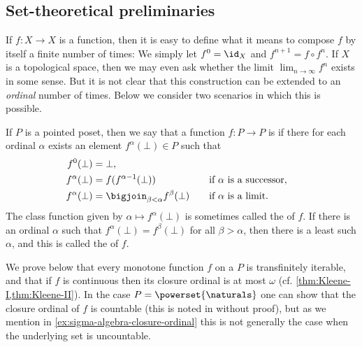 \subsection{Set-theoretical preliminaries}

If $f \colon X \to X$ is a function, then it is easy to define what it means to compose $f$ by itself a finite number of times: We simply let $f^0 = \id_X$ and $f^{n+1} = f \circ f^n$. If $X$ is a topological space, then we may even ask whether the limit $\lim_{n \to \infty} f^n$ exists in some sense. But it is not clear that this construction can be extended to an \emph{ordinal} number of times. Below we consider two scenarios in which this is possible.

If $P$ is a pointed poset, then we say that a function $f \colon P \to P$ is  if there for each ordinal $\alpha$ exists an element $f^\alpha(\bot) \in P$ such that
%
\begin{alignat*}{2}
    f^0(\bot)
        &= \bot, \\
    f^\alpha(\bot)
        &= f(f^{\alpha-1}(\bot))
        \quad &&\text{if $\alpha$ is a successor}, \\
    f^\alpha(\bot)
        &= \bigjoin_{\beta < \alpha} f^\beta(\bot)
        \quad &&\text{if $\alpha$ is a limit}.
\end{alignat*}
%
The class function given by $\alpha \mapsto f^\alpha(\bot)$ is sometimes called the  of $f$. If there is an ordinal $\alpha$ such that $f^\alpha(\bot) = f^\beta(\bot)$ for all $\beta > \alpha$, then there is a least such $\alpha$, and this is called the  of $f$.


\begin{remark}
    We prove below that every monotone function $f$ on a \cCPPO{} $P$ is transfinitely iterable, and that if $f$ is continuous then its closure ordinal is at most $\omega$ (cf. \cref{thm:Kleene-I,thm:Kleene-II}). In the case $P = \powerset{\naturals}$ one can show that the closure ordinal of $f$ is countable (this is noted in \cite[Remark~1]{AANDERAA1974207} without proof), but as we mention in \cref{ex:sigma-algebra-closure-ordinal} this is not generally the case when the underlying set is uncountable.
\end{remark}

